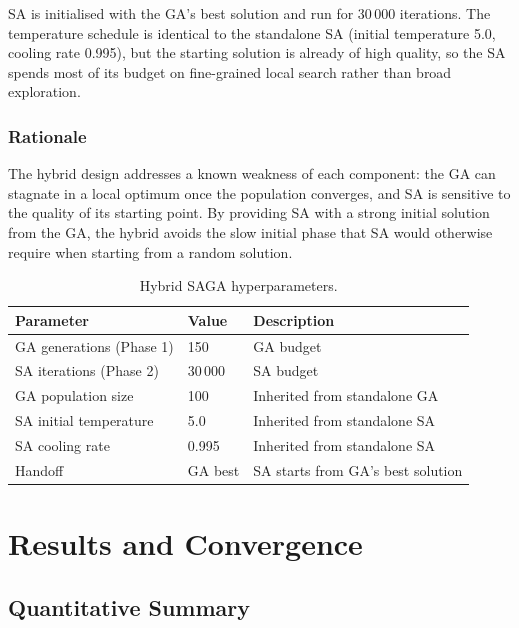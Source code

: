 \documentclass[12pt,a4paper]{article}
\begin{document}
SA is initialised with the GA's best solution and run for 30\,000 iterations.
The temperature schedule is identical to the standalone SA (initial temperature 5.0, cooling rate 0.995), but the starting solution is already of high quality, so the SA spends most of its budget on fine-grained local search rather than broad exploration.

\subsubsection*{Rationale}

The hybrid design addresses a known weakness of each component: the GA can stagnate in a local optimum once the population converges, and SA is sensitive to the quality of its starting point.
By providing SA with a strong initial solution from the GA, the hybrid avoids the slow initial phase that SA would otherwise require when starting from a random solution.

\begin{table}[H]
  \centering
  \caption{Hybrid SAGA hyperparameters.}
  \label{tab:saga_params}
  \begin{tabular}{lll}
    \toprule
    \textbf{Parameter} & \textbf{Value} & \textbf{Description} \\
    \midrule
    GA generations (Phase 1) & 150       & GA budget \\
    SA iterations (Phase 2)  & 30\,000   & SA budget \\
    GA population size       & 100       & Inherited from standalone GA \\
    SA initial temperature   & 5.0       & Inherited from standalone SA \\
    SA cooling rate          & 0.995     & Inherited from standalone SA \\
    Handoff                  & GA best   & SA starts from GA's best solution \\
    \bottomrule
  \end{tabular}
\end{table}

\section{Results and Convergence}

\subsection{Quantitative Summary}
\end{document}

